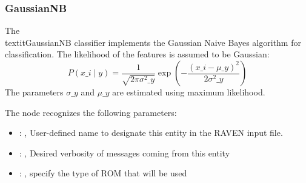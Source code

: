 \subsubsection{GaussianNB}
  The \\textit{GaussianNB} classifier implements the Gaussian Naive Bayes
  algorithm for classification.                          The likelihood of the features is assumed
  to be Gaussian:                          \begin{equation}                              P(x\_i \mid
  y) = \frac{1}{\sqrt{2\pi\sigma^2\_y}} \exp\left(-\frac{(x\_i -
  \mu\_y)^2}{2\sigma^2\_y}\right)                          \end{equation}                          The
  parameters $\sigma\_y$ and $\mu\_y$ are estimated using maximum likelihood.

  The  node recognizes the following parameters:
    \begin{itemize}
      \item {}: ,
        User-defined name to designate this entity in the RAVEN input file.
      \item {}: ,
        Desired verbosity of messages coming from this entity
      \item {}: ,
        specify the type of ROM that will be used
  \end{itemize}

